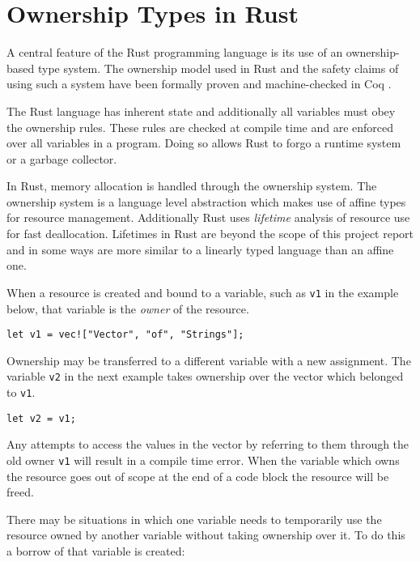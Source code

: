 \documentclass[onehalf,11pt]{beavtex}
\begin{document}
\section{Ownership Types in Rust}

A central feature of the Rust programming language is its use of an
ownership-based type system. The ownership model used in Rust and the
safety claims of using such a system have been formally proven and
machine-checked in Coq \cite{Jung:2017:RSF:3177123.3158154}.

The Rust language has inherent state and additionally all variables must obey the
ownership rules.
These rules are checked at compile time and are enforced over all variables in
a program.
Doing so allows Rust to forgo a runtime system or a garbage collector.

In Rust, memory allocation is handled through the ownership system.
The ownership system is a language level abstraction which makes use of
affine types for resource management.
Additionally Rust uses \textit{lifetime} analysis of resource use for fast
deallocation. Lifetimes in Rust are beyond the scope of this project report and
in some ways are more similar to a linearly typed language than an affine one.

When a resource is created and bound to a variable, such as \texttt{v1} in the
example below, that variable is the \textit{owner} of the resource.

\begin{verbatim}
let v1 = vec!["Vector", "of", "Strings"];
\end{verbatim}

Ownership may be transferred to a different variable with a new assignment.
The variable \texttt{v2} in the next example takes ownership over the
vector which belonged to \texttt{v1}. 

\begin{verbatim}
let v2 = v1;
\end{verbatim}

Any attempts to access the values in the vector by referring to them through
the old owner \texttt{v1} will result in a compile time error.
When the variable which owns the resource goes out of scope at the end of a
code block the resource will be freed.

There may be situations in which one variable needs to temporarily
use the resource owned by another variable without taking ownership over it.
To do this a borrow of that variable is created:
\end{document}

